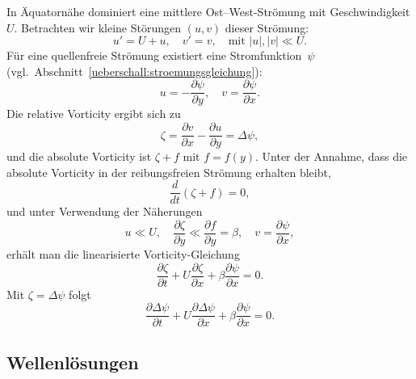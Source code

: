 In Äquatornähe dominiert eine mittlere Ost–West-Strömung mit Geschwindigkeit
\(U\). Betrachten wir kleine Störungen \((u,v)\) dieser Strömung:
\begin{equation}
	u' = U + u, \quad v' = v, \quad \text{mit } |u|, |v| \ll U.
	\label{rossby:eq:perturbation}
\end{equation}
Für eine quellenfreie Strömung existiert eine Stromfunktion~$\psi$ (vgl.~Abschnitt~\ref{ueberschall:stroemungsgleichung}):
\begin{equation}
	u = -\frac{\partial \psi}{\partial y}, \quad v = \frac{\partial \psi}{\partial x}.
	\label{rossby:eq:stream_function}
\end{equation}
Die relative Vorticity ergibt sich zu
\begin{equation}
	\zeta = \frac{\partial v}{\partial x} - \frac{\partial u}{\partial y} = \Delta \psi,
	\label{rossby:eq:relative_vorticity}
\end{equation}
und die absolute Vorticity ist \(\zeta + f\) mit \(f = f(y)\). Unter der Annahme, dass die absolute Vorticity in der reibungsfreien Strömung erhalten bleibt,
\begin{equation}
	\frac{d}{dt} (\zeta + f) = 0,
	\label{rossby:eq:absolute_vorticity_conservation}
\end{equation}
und unter Verwendung der Näherungen
\[
	u \ll U, \quad \frac{\partial \zeta}{\partial y} \ll \frac{\partial f}{\partial y} = \beta, \quad v = \frac{\partial \psi}{\partial x},
\]
erhält man die linearisierte Vorticity-Gleichung
\begin{equation}
	\frac{\partial \zeta}{\partial t} + U \frac{\partial \zeta}{\partial x} + \beta \frac{\partial \psi}{\partial x} = 0.
	\label{rossby:eq:linear_vorticity_equation}
\end{equation}
Mit \(\zeta = \Delta \psi\) folgt
\begin{equation}
	\frac{\partial \Delta \psi}{\partial t} + U \frac{\partial \Delta \psi}{\partial x} + \beta \frac{\partial \psi}{\partial x} = 0.
	\label{rossby:eq:linear_vorticity_equation_psi}
\end{equation}

\subsection{Wellenlösungen\label{subsection:rossby:loesungen}}

